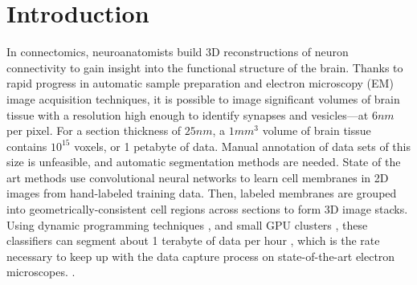 \section{Introduction}


In connectomics, neuroanatomists build 3D reconstructions of neuron connectivity to gain insight into the functional structure of the brain. Thanks to rapid progress in automatic sample preparation and electron microscopy (EM) image acquisition techniques, it is possible to image significant volumes of brain tissue with a resolution high enough to identify synapses and vesicles---at $6nm$ per pixel. For a section thickness of $25nm$, a $1 mm^3$ volume of brain tissue contains $10^{15}$ voxels, or 1 petabyte of data. Manual annotation of data sets of this size is unfeasible, and automatic segmentation methods are needed. State of the art methods use convolutional neural networks to learn cell membranes in 2D images from hand-labeled training data. Then, labeled membranes are grouped into geometrically-consistent cell regions across sections to form 3D image stacks. Using dynamic programming techniques , and small GPU clusters , these classifiers can segment about 1 terabyte of data per hour \cite{kasthuri2015saturated,lee2015recursive}, which is the rate necessary to keep up with the data capture process on state-of-the-art electron microscopes. .  %

